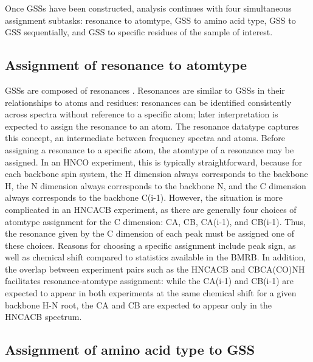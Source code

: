 Once GSSs have been constructed, analysis continues with four simultaneous 
assignment subtasks: resonance to atomtype, GSS to amino acid type, GSS to
GSS sequentially, and GSS to specific residues of the sample of interest.

\subsection{Assignment of resonance to atomtype}
GSSs are composed of resonances \cite{ccpn}.  Resonances are 
similar to GSSs in their relationships to atoms and residues: resonances can 
be identified consistently across spectra without reference to a specific 
atom; later interpretation is expected to assign the resonance to an atom.  
The resonance datatype captures this concept, an intermediate between 
frequency spectra and atoms.  Before assigning a resonance to a specific 
atom, the atomtype of a resonance may be assigned.  In an HNCO experiment, 
this is typically straightforward, because for each backbone spin system, 
the H dimension always corresponds to the backbone H, the N dimension always 
corresponds to the backbone N, and the C dimension always corresponds to the 
backbone C(i-1).  However, the situation is more complicated in an HNCACB 
experiment, as there are generally four choices of atomtype assignment for 
the C dimension:  CA, CB, CA(i-1), and CB(i-1).  Thus, the resonance given 
by the C dimension of each peak must be assigned one of these choices.  
Reasons for choosing a specific assignment include peak sign, as well as 
chemical shift compared to statistics available in the BMRB.  In addition, 
the overlap between experiment pairs such as the HNCACB and CBCA(CO)NH 
facilitates resonance-atomtype assignment: while the CA(i-1) and CB(i-1) 
are expected to appear in both experiments at the same chemical shift for 
a given backbone H-N root, the CA and CB are expected to appear only in the 
HNCACB spectrum.

\subsection{Assignment of amino acid type to GSS}

